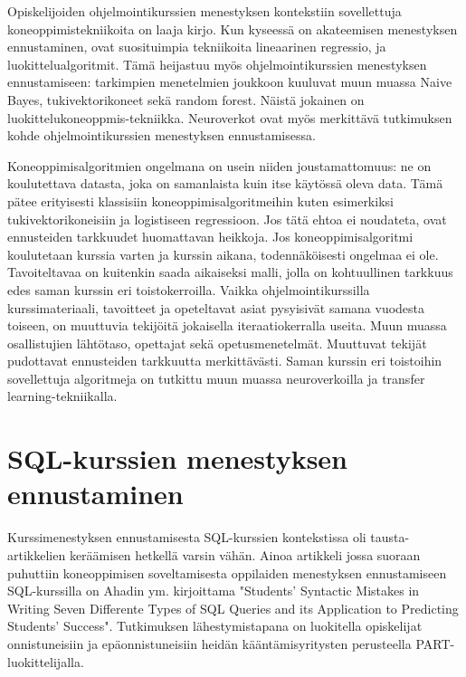 \documentclass[finnish,twoside,openright]{HYgraduMLDS}
\begin{document}
Opiskelijoiden ohjelmointikurssien menestyksen kontekstiin sovellettuja koneoppimistekniikoita on laaja kirjo. Kun kyseessä on akateemisen menestyksen ennustaminen, ovat suosituimpia tekniikoita lineaarinen regressio, ja luokittelualgoritmit\cite{hellas2018predicting}. Tämä heijastuu myös ohjelmointikurssien menestyksen ennustamiseen: tarkimpien menetelmien joukkoon kuuluvat muun muassa Naive Bayes\cite{bergin2015using}, tukivektorikoneet\cite{bergin2015using} sekä random forest\cite{lagus2018transfer}. Näistä jokainen on luokittelukoneoppmis-tekniikka. Neuroverkot ovat myös merkittävä tutkimuksen kohde ohjelmointikurssien menestyksen ennustamisessa\cite{Castro-Wunsch:2017:ENN:3017680.3017792}. 

Koneoppimisalgoritmien ongelmana on usein niiden joustamattomuus: ne on koulutettava datasta, joka on samanlaista kuin itse käytössä oleva data. Tämä pätee erityisesti klassisiin koneoppimisalgoritmeihin kuten esimerkiksi tukivektorikoneisiin ja logistiseen regressioon. Jos tätä ehtoa ei noudateta, ovat ennusteiden tarkkuudet huomattavan heikkoja. Jos koneoppimisalgoritmi koulutetaan kurssia varten ja kurssin aikana, todennäköisesti ongelmaa ei ole. Tavoiteltavaa on kuitenkin saada aikaiseksi malli, jolla on kohtuullinen tarkkuus edes saman kurssin eri toistokerroilla. Vaikka ohjelmointikurssilla kurssimateriaali, tavoitteet ja opeteltavat asiat pysyisivät samana vuodesta toiseen, on muuttuvia tekijöitä jokaisella iteraatiokerralla useita. Muun muassa osallistujien lähtötaso, opettajat sekä opetusmenetelmät. Muuttuvat tekijät pudottavat ennusteiden tarkkuutta merkittävästi. Saman kurssin eri toistoihin sovellettuja algoritmeja on tutkittu muun muassa neuroverkoilla\cite{Castro-Wunsch:2017:ENN:3017680.3017792} ja transfer learning\cite{lagus2018transfer}-tekniikalla.


\section{SQL-kurssien menestyksen ennustaminen}

Kurssimenestyksen ennustamisesta SQL-kurssien kontekstissa oli tausta-artikkelien keräämisen hetkellä varsin vähän. Ainoa artikkeli jossa suoraan puhuttiin koneoppimisen soveltamisesta oppilaiden menestyksen ennustamiseen SQL-kurssilla on Ahadin ym. kirjoittama "Students' Syntactic Mistakes in Writing Seven Differente Types of SQL Queries and its Application to Predicting Students' Success"\cite{Ahadi:2016:SSM:2839509.2844640}. Tutkimuksen lähestymistapana on luokitella opiskelijat onnistuneisiin ja epäonnistuneisiin heidän kääntämisyritysten perusteella PART-luokittelijalla.
\end{document}
